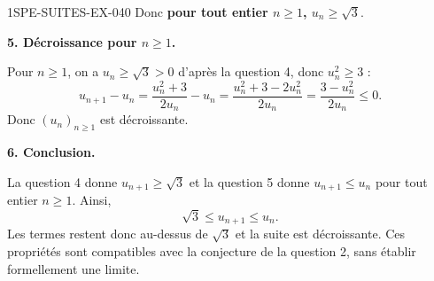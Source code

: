\begin{corrige}{1SPE-SUITES-EX-040}
Donc \textbf{pour tout entier $n \geq 1$, $u_n \geq \sqrt{3}$}.

\textbf{5. Décroissance pour $n \geq 1$.}

Pour $n \geq 1$, on a $u_n \geq \sqrt{3} > 0$ d'après la question 4, donc $u_n^2 \geq 3$ :
\[
u_{n+1} - u_n = \frac{u_n^2 + 3}{2u_n} - u_n = \frac{u_n^2 + 3 - 2u_n^2}{2u_n} = \frac{3 - u_n^2}{2u_n} \leq 0.
\]
Donc $(u_n)_{n \geq 1}$ est décroissante.

\textbf{6. Conclusion.}

La question 4 donne $u_{n+1} \geq \sqrt{3}$ et la question 5 donne $u_{n+1} \leq u_n$ pour tout entier $n \geq 1$. Ainsi,
\[
\boxed{\sqrt{3} \leq u_{n+1} \leq u_n.}
\]
Les termes restent donc au-dessus de $\sqrt{3}$ et la suite est décroissante. Ces propriétés sont compatibles avec la conjecture de la question 2, sans établir formellement une limite.


\end{corrige}
